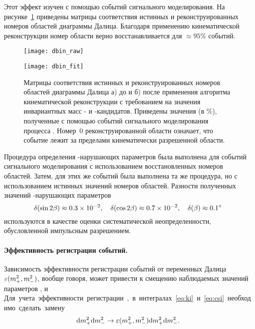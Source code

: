 Этот эффект изучен с помощью событий сигнального моделирования.  На рисунке~\ref{fig:dp_confusion} приведены матрицы соответствия истинных и реконструированных номеров областей диаграммы Далица.  Благодаря применению кинематической реконструкции номер области верно восстанавливается для $\approx95\%$ событий.  

\begin{figure}[htb]
 \begin{minipage}[b]{0.45\textwidth}
  \centering
  \texttt{[image: dbin\_raw]}
  \subcaption{}
 \end{minipage}
 \begin{minipage}[b]{0.49\textwidth}
 \hfill
  \centering
  \texttt{[image: dbin\_fit]}
  \subcaption{}
 \end{minipage}
  \caption{Матрицы соответствия истинных и реконструированных номеров областей диаграммы Далица а) до и б) после применения алгоритма кинематической реконструкции с требованием на значения инвариантных масс \dn- и \ks-кандидатов.   Приведены значения (в \%), полученные с помощью событий сигнального моделирования процесса \bdpi.  Номер~$0$ реконструированной области означает, что событие лежит за пределами кинематически разрешенной области.}
  \label{fig:dp_confusion}
\end{figure}

Процедура определения \cpconj-нарушающих параметров была выполнена для событий сигнального моделирования с использованием восстановленных номеров областей.  Затем, для этих же событий была выполнена та же процедура, но с использованием истинных значений номеров областей.  Разности полученных значений \cpconj-нарушающих параметров
\begin{equation}
 \delta(\sin{2\ensuremath{\beta}}) \approx 0.3\times10^{-2},\quad
 \delta(\cos{2\ensuremath{\beta}}) \approx 0.7\times10^{-2},\quad
 \delta(\beta)     \approx 0.1^{\circ}
\end{equation}
используются в качестве оценки систематической неопределенности, обусловленной импульсным разрешением.

\paragraph{Эффективность регистрации событий. }%
Зависимость эффективности регистрации событий от переменных Далица $\varepsilon(m_+^2,m_-^2)$, вообще говоря, может привести к смещению наблюдаемых значений параметров \ki, \ci и \si.  Для учета эффективности регистрации, в интегралах~\eqref{eq:ki} и \eqref{eq:csi} необходимо сделать замену
\begin{equation}
 \mathrm{d}m_+^2\mathrm{d}m_-^2\to \varepsilon(m_+^2,m_-^2)\mathrm{d}m_+^2\mathrm{d}m_-^2.
\end{equation}  

